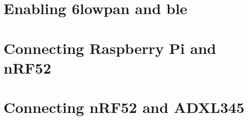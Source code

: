\section{Enabling \gls{6lowpan} and \gls{ble}}



\section{Connecting Raspberry Pi and nRF52}

\section{Connecting nRF52 and ADXL345}

